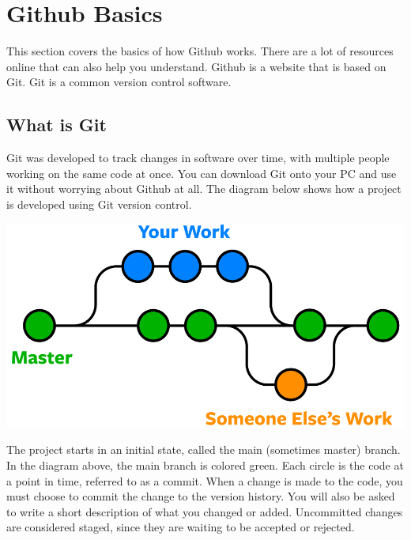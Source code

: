 \documentclass[
  letterpaper,
  DIV=11,
  numbers=noendperiod]{scrreprt}
\author{}
\date{}
\begin{document}
\ifdefined\Shaded\renewenvironment{Shaded}{\begin{tcolorbox}[breakable, sharp corners, borderline west={3pt}{0pt}{shadecolor}, enhanced, frame hidden, boxrule=0pt, interior hidden]}{\end{tcolorbox}}\fi

\hypertarget{github-basics}{%
\chapter{Github Basics}\label{github-basics}}

This section covers the basics of how Github works. There are a lot of
resources online that can also help you understand. Github is a website
that is based on Git. Git is a common version control software.

\hypertarget{what-is-git}{%
\section{What is Git}\label{what-is-git}}

Git was developed to track changes in software over time, with multiple
people working on the same code at once. You can download Git onto your
PC and use it without worrying about Github at all. The diagram below
shows how a project is developed using Git version control.

\includegraphics{Github_Basics_files/mediabag/git-branches-merge.png}

The project starts in an initial state, called the main (sometimes
master) branch. In the diagram above, the main branch is colored green.
Each circle is the code at a point in time, referred to as a commit.
When a change is made to the code, you must choose to commit the change
to the version history. You will also be asked to write a short
description of what you changed or added. Uncommitted changes are
considered staged, since they are waiting to be accepted or rejected.
\end{document}
